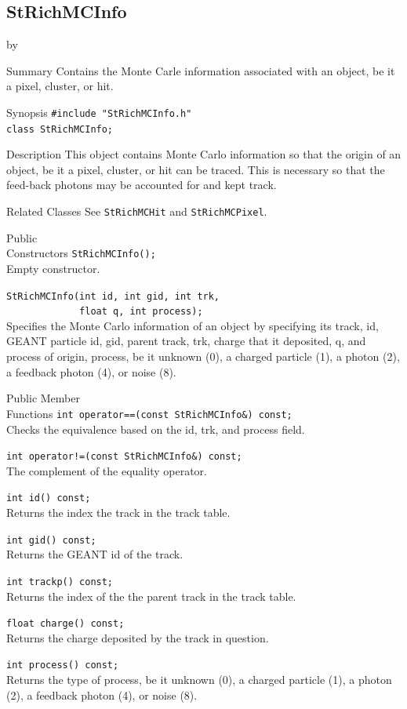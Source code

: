 \documentclass[twoside]{article}
\newcommand{\entrylabel}[1]{\mbox{\textbf{{#1}}}\hfil}%
\newenvironment{entry}
{\begin{list}{}%
    {\renewcommand{\makelabel}{\entrylabel}%
     \setlength{\labelwidth}{90pt}%
     \setlength{\leftmargin}{\labelwidth}
     \advance\leftmargin by \labelsep%
      }%
    }%
  {\end{list}}
\newcommand{\Entrylabel}[1]%
{\raisebox{0pt}[1ex][0pt]{\makebox[\labelwidth][l]%
    {\parbox[t]{\labelwidth}{\hspace{0pt}\textbf{{#1}}}}}}
\newenvironment{Entry}%
{\renewcommand{\entrylabel}{\Entrylabel}\begin{entry}}%
  {\end{entry}}
\begin{document}
\subsection{StRichMCInfo}
\label{sec:StRichMCInfo}
\begin{Entry}
\item[Summary] Contains the Monte Carle information associated with
    an object, be it a pixel, cluster, or hit.
\item[Synopsis]
    \verb+#include "StRichMCInfo.h"+\\
    \verb+class StRichMCInfo;+\\
\item[Description] This object contains Monte Carlo information
    so that the origin of an object, be it a pixel, cluster, or
    hit can be traced.  This is necessary so that the feed-back
    photons may be accounted for and kept track.
\item[Related Classes]
    See \texttt{StRichMCHit} and \texttt{StRichMCPixel}.
\item[Public\\ Constructors]
    \verb+StRichMCInfo();+\\
    Empty constructor.

    \verb+StRichMCInfo(int id, int gid, int trk,+\\
    \verb+             float q, int process);+\\
    Specifies the Monte Carlo information of an object by specifying
    its track, id, GEANT particle id, gid, parent track, trk,
    charge that it deposited, q, and process of origin, process, be it
    unknown (0), a charged particle (1), a photon (2), a feedback
    photon (4), or noise (8).
\item[Public Member\\ Functions]
    \verb+int operator==(const StRichMCInfo&) const;+\\
    Checks the equivalence based on the id, trk, and process
    field.

    \verb+int operator!=(const StRichMCInfo&) const;+\\
    The complement of the equality operator.

    \verb+int id() const;+\\
    Returns the index the track in the track table.

    \verb+int gid() const;+\\
    Returns the GEANT id of the track.

    \verb+int trackp() const;+\\
    Returns the index of the the parent track in
    the track table.

    \verb+float charge() const;+\\
    Returns the charge deposited by the track in question.

    \verb+int process() const;+\\
    Returns the type of process, be it unknown (0), a charged
    particle (1), a photon (2), a feedback photon (4), or
    noise (8).

\end{Entry}
\clearpage
\end{document}
